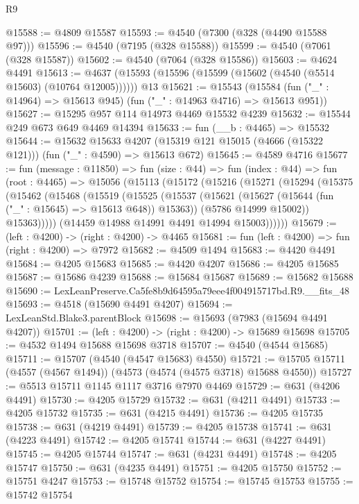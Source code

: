 \begin{lexlean}{R9}
\begin{coremodule}
@15588 := @4809 @15587
@15593 := @4540 (@7300 (@328 (@4490 @15588 @97)))
@15596 := @4540 (@7195 (@328 @15588))
@15599 := @4540 (@7061 (@328 @15587))
@15602 := @4540 (@7064 (@328 @15586))
@15603 := @4624 @4491
@15613 := @4637 (@15593 (@15596 (@15599 (@15602 (@4540 (@5514 @15603) (@10764 @12005)))))) @13
@15621 := @15543
    (@15584 (fun ("_" : @14964) => @15613 @945) (fun ("_" : @14963 @4716) => @15613 @951))
@15627 := @15295 @957 @114 @14973 @4469 @15532 @4239
@15632 := @15544 @249 @673 @649 @4469 @14394
@15633 := fun (__b : @4465) => @15532
@15644 := @15632
    @15633
    @4207
    (@15319 @121 @15015 (@4666 (@15322 @121)))
    (fun ("_" : @4590) => @15613 @672)
@15645 := @4589 @4716
@15677 := fun (message : @11850) =>
  fun (size : @44) =>
  fun (index : @44) =>
  fun (root : @4465) =>
  @15056
    (@15113
      (@15172
        (@15216
          (@15271
            (@15294
              (@15375
                (@15462
                  (@15468
                    (@15519
                      (@15525
                        (@15537
                          (@15621 (@15627 (@15644 (fun ("_" : @15645) => @15613 @648)) @15363))
                          (@5786 @14999 @15002))
                        @15363)))))
              (@14459 @14988 @14991 @4491 @14994 @15003))))))
@15679 := (left : @4200) -> (right : @4200) -> @4465
@15681 := fun (left : @4200) => fun (right : @4200) => @7972
@15682 := @4509 @1494
@15683 := @4420 @4491
@15684 := @4205 @15683
@15685 := @4420 @4207
@15686 := @4205 @15685
@15687 := @15686 @4239
@15688 := @15684 @15687
@15689 := @15682 @15688
@15690 := LexLeanPreserve.Ca5fe8b9d64595a79eee4f004915717bd.R9.__fits_48
@15693 := @4518 (@15690 @4491 @4207)
@15694 := LexLeanStd.Blake3.parentBlock
@15698 := @15693 (@7983 (@15694 @4491 @4207))
@15701 := (left : @4200) -> (right : @4200) -> @15689 @15698
@15705 := @4532 @1494 @15688 @15698 @3718
@15707 := @4540 (@4544 @15685)
@15711 := @15707 (@4540 (@4547 @15683) @4550)
@15721 := @15705 @15711 (@4557 (@4567 @1494)) (@4573 (@4574 (@4575 @3718) @15688 @4550))
@15727 := @5513 @15711 @1145 @1117 @3716 @7970 @4469
@15729 := @631 (@4206 @4491)
@15730 := @4205 @15729
@15732 := @631 (@4211 @4491)
@15733 := @4205 @15732
@15735 := @631 (@4215 @4491)
@15736 := @4205 @15735
@15738 := @631 (@4219 @4491)
@15739 := @4205 @15738
@15741 := @631 (@4223 @4491)
@15742 := @4205 @15741
@15744 := @631 (@4227 @4491)
@15745 := @4205 @15744
@15747 := @631 (@4231 @4491)
@15748 := @4205 @15747
@15750 := @631 (@4235 @4491)
@15751 := @4205 @15750
@15752 := @15751 @4247
@15753 := @15748 @15752
@15754 := @15745 @15753
@15755 := @15742 @15754

\end{coremodule}
\end{lexlean}
